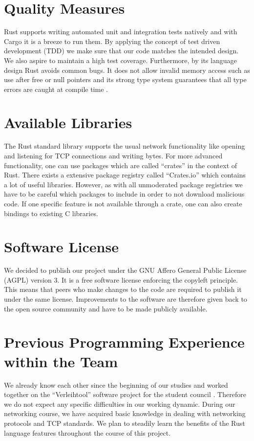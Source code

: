 \documentclass[a4paper, 11pt]{article}
\begin{document}
\section*{Quality Measures}
Rust supports writing automated unit and integration tests natively and with Cargo it is a breeze to run them. By applying the concept of test driven development (TDD) we make sure that our code matches the intended design. We also aspire to maintain a high test coverage.
Furthermore, by its language design Rust avoids common bugs. It does not allow invalid memory access such as use after free or null pointers and its strong type system guarantees that all type errors are caught at compile time \cite{RustBook}.

\section*{Available Libraries}
The Rust standard library supports the usual network functionality like opening and listening for TCP connections and writing bytes. For more advanced functionality, one can use packages which are called ``crates'' in the context of Rust.
There exists a extensive package registry called ``Crates.io'' \cite{Crates} which contains a lot of useful libraries. However, as with all unmoderated package registries we have to be careful which packages to include in order to not download malicious code. If one specific feature is not available through a crate, one can also create bindings to existing C libraries.

\section*{Software License}
We decided to publish our project under the GNU Affero General Public License (AGPL)  \cite{AGPL} version 3. It is a free software license enforcing the copyleft principle. This means that peers who make changes to the code are required to publish it under the same license. Improvements to the software are therefore given back to the open source community and have to be made publicly available.

\section*{Previous Programming Experience within the Team}
We already know each other since the beginning of our studies and worked together on the ``Verleihtool'' software project for the student council  \cite{verleihtool}. Therefore we do not expect any specific difficulties in our working dynamic.
During our networking course, we have acquired basic knowledge in dealing with networking protocols and TCP standards. We plan to steadily learn the benefits of the Rust language features throughout the course of this project.
\end{document}
